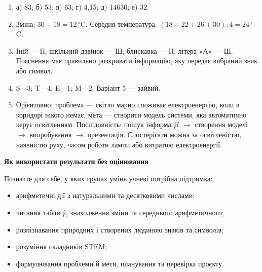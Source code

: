 \documentclass[10pt,a4paper]{article}
\begin{document}
\begin{enumerate}
  \item а) 83; б) 53; в) 63; г) 4,15; д) 14630; е) 32.
  \item Зміна: $30-18=12\,^{\circ}$C. Середня температура: $(18+22+26+30):4=24\,^{\circ}$C.
  \item Іній --- П; шкільний дзвінок --- Ш; блискавка --- П; літера «А» --- Ш. Пояснення має правильно розкривати інформацію, яку передає вибраний знак або символ.
  \item S---3; T---4; E---1; M---2. Варіант 5 --- зайвий.
  \item Орієнтовно: проблема --- світло марно споживає електроенергію, коли в коридорі нікого немає; мета --- створити модель системи, яка автоматично керує освітленням. Послідовність: пошук інформації $\rightarrow$ створення моделі $\rightarrow$ випробування $\rightarrow$ презентація. Спостерігати можна за освітленістю, наявністю руху, часом роботи лампи або витратою електроенергії.
\end{enumerate}

\textbf{Як використати результати без оцінювання}

Позначте для себе, у яких групах умінь учневі потрібна підтримка:
\begin{itemize}[leftmargin=*]
  \item арифметичні дії з натуральними та десятковими числами;
  \item читання таблиці, знаходження зміни та середнього арифметичного;
  \item розпізнавання природних і створених людиною знаків та символів;
  \item розуміння складників STEM;
  \item формулювання проблеми й мети, планування та перевірка проєкту.
\end{itemize}
\end{document}
